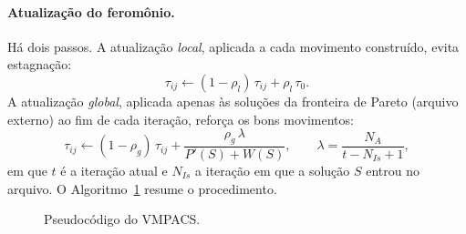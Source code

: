 \documentclass[11pt]{article}
\begin{document}
\paragraph{Atualização do feromônio.} Há dois passos. A atualização
\emph{local}, aplicada a cada movimento construído, evita estagnação:
\begin{equation}
  \tau_{ij}\leftarrow(1-\rho_{l})\,\tau_{ij}+\rho_{l}\,\tau_{0}.
  \label{eq:local}
\end{equation}
A atualização \emph{global}, aplicada apenas às soluções da fronteira de Pareto
(arquivo externo) ao fim de cada iteração, reforça os bons movimentos:
\begin{equation}
  \tau_{ij}\leftarrow(1-\rho_{g})\,\tau_{ij}+\frac{\rho_{g}\,\lambda}{P'(S)+W(S)},
  \qquad \lambda=\frac{N_{A}}{t-N_{Is}+1},
  \label{eq:global}
\end{equation}
em que $t$ é a iteração atual e $N_{Is}$ a iteração em que a solução $S$ entrou no
arquivo. O Algoritmo~\ref{alg:vmpacs} resume o procedimento.

\begin{figure}[H]
\centering
{}
\caption{Pseudocódigo do VMPACS.}
\label{alg:vmpacs}
\end{figure}
\end{document}
